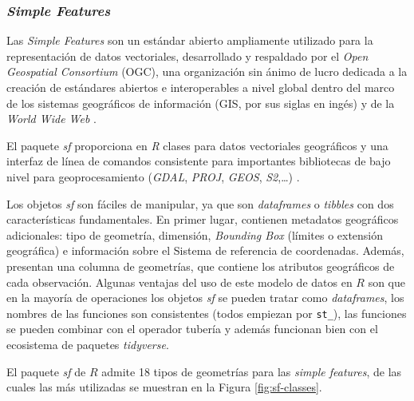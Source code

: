 \documentclass[12pt,a4paper,]{book}
\numberwithin{dummy}{section}
\theoremstyle{ocrenumbox}
\theoremstyle{blacknumex}
\theoremstyle{blacknumbox}
\theoremstyle{ocrenum}
\theoremstyle{ocrenum}
\begin{document}
\hypertarget{simple-features}{%
\subsubsection*{\texorpdfstring{\emph{Simple
Features}}{Simple Features}}\label{simple-features}}

Las \emph{Simple Features} son un estándar abierto ampliamente utilizado
para la representación de datos vectoriales, desarrollado y respaldado
por el \emph{Open Geospatial Consortium} (OGC), una organización sin
ánimo de lucro dedicada a la creación de estándares abiertos e
interoperables a nivel global dentro del marco de los sistemas
geográficos de información (GIS, por sus siglas en ingés) y de la
\emph{World Wide Web} \citep{OCGweb}.

El paquete \emph{sf} proporciona en \emph{R} clases para datos
vectoriales geográficos y una interfaz de línea de comandos consistente
para importantes bibliotecas de bajo nivel para geoprocesamiento
(\emph{GDAL}, \emph{PROJ}, \emph{GEOS}, \emph{S2},\ldots)
\citep{sfpackage}.

Los objetos \emph{sf} son fáciles de manipular, ya que son
\emph{dataframes} o \emph{tibbles} con dos características
fundamentales. En primer lugar, contienen metadatos geográficos
adicionales: tipo de geometría, dimensión, \emph{Bounding Box} (límites
o extensión geográfica) e información sobre el Sistema de referencia de
coordenadas. Además, presentan una columna de geometrías, que contiene
los atributos geográficos de cada observación. Algunas ventajas del uso
de este modelo de datos en \(R\) son que en la mayoría de operaciones
los objetos \emph{sf} se pueden tratar como \emph{dataframes}, los
nombres de las funciones son consistentes (todos empiezan por
\texttt{st\_}), las funciones se pueden combinar con el operador tubería
y además funcionan bien con el ecosistema de paquetes \emph{tidyverse}.

El paquete \emph{sf} de \(R\) admite 18 tipos de geometrías para las
\emph{simple features}, de las cuales las más utilizadas se muestran en
la Figura \ref{fig:sf-classes}.
\end{document}
